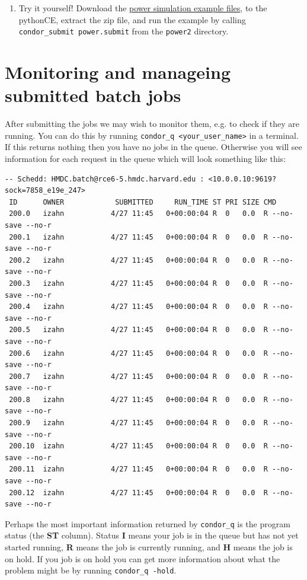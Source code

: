 \documentclass[11pt]{article}
\begin{document}
\begin{enumerate}
\item Try it yourself!
\label{sec:org21e7359}
Download the \href{Python\_examples/power2.zip}{power simulation example files}, to the pythonCE, extract the zip file, and run the example by calling \texttt{condor\_submit power.submit} from the \texttt{power2} directory.
\end{enumerate}




\section{Monitoring and manageing submitted batch jobs}
\label{sec:org723073c}
After submitting the jobs we may wish to monitor them, e.g. to check if they are running. You can do this by running \texttt{condor\_q <your\_user\_name>} in a terminal. If this returns nothing then you have no jobs in the queue. Otherwise you will see information for each request in the queue which will look something like this:
\begin{verbatim}
-- Schedd: HMDC.batch@rce6-5.hmdc.harvard.edu : <10.0.0.10:9619?sock=7858_e19e_247>
 ID      OWNER            SUBMITTED     RUN_TIME ST PRI SIZE CMD               
 200.0   izahn           4/27 11:45   0+00:00:04 R  0   0.0  R --no-save --no-r
 200.1   izahn           4/27 11:45   0+00:00:04 R  0   0.0  R --no-save --no-r
 200.2   izahn           4/27 11:45   0+00:00:04 R  0   0.0  R --no-save --no-r
 200.3   izahn           4/27 11:45   0+00:00:04 R  0   0.0  R --no-save --no-r
 200.4   izahn           4/27 11:45   0+00:00:04 R  0   0.0  R --no-save --no-r
 200.5   izahn           4/27 11:45   0+00:00:04 R  0   0.0  R --no-save --no-r
 200.6   izahn           4/27 11:45   0+00:00:04 R  0   0.0  R --no-save --no-r
 200.7   izahn           4/27 11:45   0+00:00:04 R  0   0.0  R --no-save --no-r
 200.8   izahn           4/27 11:45   0+00:00:04 R  0   0.0  R --no-save --no-r
 200.9   izahn           4/27 11:45   0+00:00:04 R  0   0.0  R --no-save --no-r
 200.10  izahn           4/27 11:45   0+00:00:04 R  0   0.0  R --no-save --no-r
 200.11  izahn           4/27 11:45   0+00:00:04 R  0   0.0  R --no-save --no-r
 200.12  izahn           4/27 11:45   0+00:00:04 R  0   0.0  R --no-save --no-r
\end{verbatim}
Perhaps the most important information returned by \texttt{condor\_q} is the program status (the \textbf{ST} column). Status \textbf{I} means your job is in the queue but has not yet started running, \textbf{R} means the job is currently running, and \textbf{H} means the job is on hold. If you job is on hold you can get more information about what the problem might be by running \texttt{condor\_q -hold}.
\end{document}
